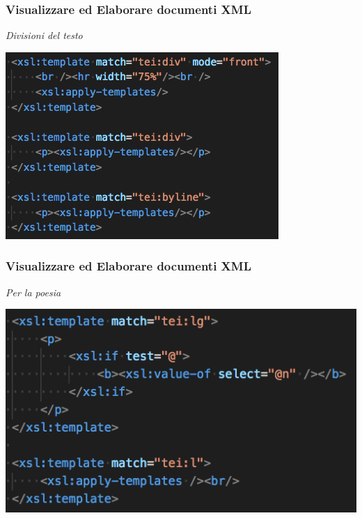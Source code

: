 \begin{frame}
    \frametitle{Visualizzare ed Elaborare documenti XML}
    \addtocounter{nframe}{1}
    
        \textit{Divisioni del testo}

    \begin{center}
        \includegraphics[width=.8\textwidth]{imgs/EsempioCommentato5.png}
    \end{center}

\end{frame}


\begin{frame}
    \frametitle{Visualizzare ed Elaborare documenti XML}
    \addtocounter{nframe}{1}
    
        \textit{Per la poesia}

    \begin{center}
        \includegraphics[width=.9\textwidth]{imgs/EsempioCommentato6.png}
    \end{center}

\end{frame}



